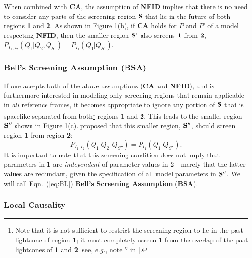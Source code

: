 \documentclass[rmp, aps, preprint, longbibliography]{revtex4-1}
\newcommand{\eq}[1]{{Eqn.~(\ref{#1})}}
\begin{document}
When combined with {\bf CA}, the assumption of {\bf NFID} implies that there is no need to consider any parts of the screening region $\bf{S}$ that lie in the future of both regions {\bf 1} and {\bf 2}.  As shown in Figure 1(b), if {\bf CA} holds for $P$ and $P'$ of a model respecting {\bf NFID}, then the smaller region ${\bf S'}$ also screens ${\bf 1}$ from ${\bf 2}$, $P_{I_1,I_2}(Q_1|Q_2,Q_{S'}) = P_{I_1}(Q_1|Q_{S'})$.  


\subsubsection{Bell's Screening Assumption {\rm ({\bf BSA})}}

If one accepts both of the above assumptions ({\bf CA} and {\bf NFID}), and is furthermore interested in modeling only screening regions that remain applicable in \emph{all} reference frames, it becomes appropriate to ignore any portion of $\bf{S}$ that is spacelike separated from both\footnote{Note that it is not sufficient to restrict the screening region to lie in the past lightcone of region {\bf 1}; it must completely screen {\bf 1} from the overlap of the past lightcones of {\bf 1} and {\bf 2} [see, \emph{e.g.}, note 7 in \textcite{bell1986}].} regions {\bf 1} and {\bf 2}.  This leads to the smaller region $\bf{S''}$ shown in Figure 1(c).  \textcite{bell1990} proposed that this smaller region, $\bf{S''}$, should screen region {\bf 1} from region {\bf 2}:
\begin{equation}
\label{eq:BL}
P_{I_1,I_2}(Q_1|Q_2,Q_{S''}) = P_{I_1}(Q_1|Q_{S''}).
\end{equation}
It is important to note that this screening condition does not imply that parameters in {\bf 1} are {\em independent} of parameter values in {\bf 2}---merely that the latter values are redundant, given the specification of all model parameters in $\bf{S''}$.  We will call \eq{eq:BL} {\bf Bell's Screening Assumption} ({\bf BSA}).

\subsubsection{Local Causality}
\end{document}
